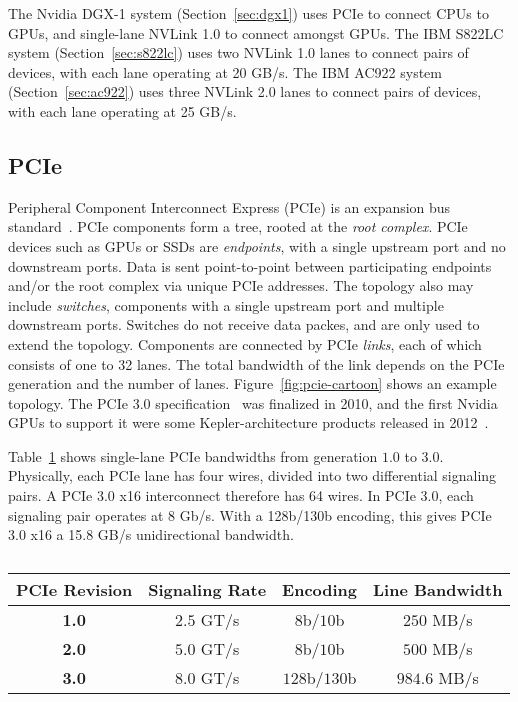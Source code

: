 The Nvidia DGX-1 system (Section~\ref{sec:dgx1}) uses PCIe to connect CPUs to GPUs, and single-lane NVLink 1.0 to connect amongst GPUs.
The IBM S822LC system (Section~\ref{sec:s822lc}) uses two NVLink 1.0 lanes to connect pairs of devices, with each lane operating at 20 GB/s.
The IBM AC922 system (Section~\ref{sec:ac922}) uses three NVLink 2.0 lanes to connect pairs of devices, with each lane operating at 25 GB/s.

\subsection{PCIe}

Peripheral Component Interconnect Express (PCIe) is an expansion bus standard~\cite{pcie10}.
PCIe components form a tree, rooted at the \textit{root complex}.
PCIe devices such as GPUs or SSDs are \textit{endpoints}, with a single upstream port and no downstream ports.
Data is sent point-to-point between participating endpoints and/or the root complex via unique PCIe addresses.
The topology also may include \textit{switches}, components with a single upstream port and multiple downstream ports.
Switches do not receive data packes, and are only used to extend the topology.
Components are connected by PCIe \textit{links}, each of which consists of one to 32 lanes.
The total bandwidth of the link depends on the PCIe generation and the number of lanes.
Figure~\ref{fig:pcie-cartoon} shows an example topology.
The PCIe 3.0 specification~\cite{pcie30} was finalized in 2010, and the first Nvidia GPUs to support it were some Kepler-architecture products released in 2012~\cite{nyland2012inside}.

Table~\ref{tab:pcie-lane-rates} shows single-lane PCIe bandwidths from generation $1.0$ to $3.0$.
Physically, each PCIe lane has four wires, divided into two differential signaling pairs.
A PCIe 3.0 x16 interconnect therefore has 64 wires.
In PCIe 3.0, each signaling pair operates at 8 Gb/s.
With a 128b/130b encoding, this gives PCIe 3.0 x16 a 15.8 GB/s unidirectional bandwidth.

\begin{table}[ht]
	\centering
	\caption[PCIe Lane Transfer Rates]{}
	\label{tab:pcie-lane-rates}
	\begin{tabular}{cccc}
		\hline
		\textbf{PCIe Revision} & \textbf{Signaling Rate} & \textbf{Encoding} & \textbf{Line Bandwidth} \\ \hline
		\textbf{1.0}           & $2.5$ GT/s                & $8$b/$10$b            & $250$   MB/s      \\ \hline
		\textbf{2.0}           & $5.0$ GT/s                & $8$b/$10$b            & $500$   MB/s      \\ \hline
		\textbf{3.0}           & $8.0$ GT/s                & $128$b/$130$b         & $984.6$ MB/s      \\ \hline
	\end{tabular}
\end{table}

